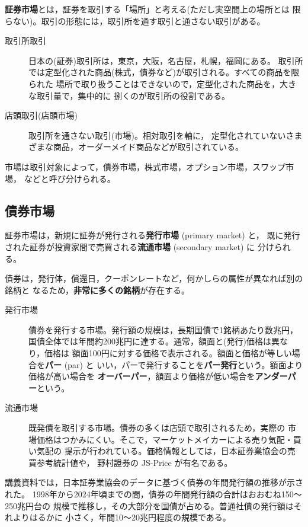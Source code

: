 \textbf{証券市場}とは，証券を取引する「場所」と考える(ただし実空間上の場所とは
限らない)。取引の形態には，取引所を通す取引と通さない取引がある。

\begin{description}
\item[取引所取引] 日本の(証券)取引所は，東京，大阪，名古屋，札幌，福岡にある。
取引所では定型化された商品(株式，債券など)が取引される。すべての商品を限られた
場所で取り扱うことはできないので，定型化された商品を，大きな取引量で，集中的に
捌くのが取引所の役割である。
\item[店頭取引(店頭市場)] 取引所を通さない取引(市場)。相対取引を軸に，
定型化されていないさまざまな商品，オーダーメイド商品などが取引されている。
\end{description}

市場は取引対象によって，債券市場，株式市場，オプション市場，スワップ市場，
などと呼び分けられる。

\subsection{債券市場}

証券市場は，新規に証券が発行される\textbf{発行市場} (primary market) と，
既に発行された証券が投資家間で売買される\textbf{流通市場} (secondary market) に
分けられる。

債券は，発行体，償還日，クーポンレートなど，何かしらの属性が異なれば別の銘柄と
なるため，\textbf{非常に多くの銘柄}が存在する。

\begin{description}
\item[発行市場] 債券を発行する市場。発行額の規模は，長期国債で1銘柄あたり数兆円，
国債全体では年間約200兆円に達する。通常，額面と(発行)価格は異なり，価格は
額面100円に対する価格で表示される。額面と価格が等しい場合を\textbf{パー} (par) と
いい，パーで発行することを\textbf{パー発行}という。額面より価格が高い場合を
\textbf{オーバーパー}，額面より価格が低い場合を\textbf{アンダーパー}という。
\item[流通市場] 既発債を取引する市場。債券の多くは店頭で取引されるため，実際の
市場価格はつかみにくい。そこで，マーケットメイカーによる売り気配・買い気配の
提示が行われている。価格情報としては，日本証券業協会の売買参考統計値や，
野村證券の JS-Price が有名である。
\end{description}

講義資料では，日本証券業協会のデータに基づく債券の年間発行額の推移が示された。
1998年から2024年頃までの間，債券の年間発行額の合計はおおむね150〜250兆円台の
規模で推移し，その大部分を国債が占める。普通社債の発行額はそれよりはるかに
小さく，年間10〜20兆円程度の規模である。

